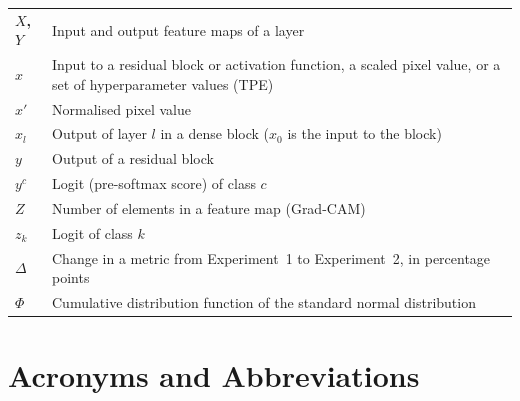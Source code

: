 \begin{longtable}{@{}>{\bfseries}lp{.7\linewidth}}
$X$, $Y$ & Input and output feature maps of a layer \\[1.0ex]
$x$ & Input to a residual block or activation function, a scaled pixel value, or a set of hyperparameter values (TPE) \\[1.0ex]
$x'$ & Normalised pixel value \\[1.0ex]
$x_l$ & Output of layer $l$ in a dense block ($x_0$ is the input to the block) \\[1.0ex]
$y$ & Output of a residual block \\[1.0ex]
$y^c$ & Logit (pre-softmax score) of class $c$ \\[1.0ex]
$Z$ & Number of elements in a feature map (Grad-CAM) \\[1.0ex]
$z_k$ & Logit of class $k$ \\[1.0ex]
$\Delta$ & Change in a metric from Experiment~1 to Experiment~2, in percentage points \\[1.0ex]
$\Phi$ & Cumulative distribution function of the standard normal distribution \\
\end{longtable}

\section*{Acronyms and Abbreviations}
{}

\printacronyms[display=all, heading=none]

\newpage
